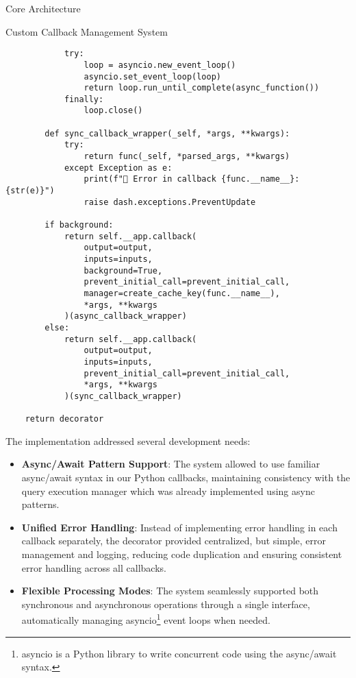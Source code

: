 \begin{section}{Core Architecture}
\begin{subsection}{Custom Callback Management System}
\begin{listing}[H]
\begin{verbatim}
            try:
                loop = asyncio.new_event_loop()
                asyncio.set_event_loop(loop)
                return loop.run_until_complete(async_function())
            finally:
                loop.close()

        def sync_callback_wrapper(_self, *args, **kwargs):
            try:
                return func(_self, *parsed_args, **kwargs)
            except Exception as e:
                print(f"🚨 Error in callback {func.__name__}: {str(e)}")
                raise dash.exceptions.PreventUpdate

        if background:
            return self.__app.callback(
                output=output,
                inputs=inputs,
                background=True,
                prevent_initial_call=prevent_initial_call,
                manager=create_cache_key(func.__name__),
                *args, **kwargs
            )(async_callback_wrapper)
        else:
            return self.__app.callback(
                output=output,
                inputs=inputs,
                prevent_initial_call=prevent_initial_call,
                *args, **kwargs
            )(sync_callback_wrapper)

    return decorator
			\end{verbatim}
			\label{lst:dashboard-implementation-callback-decorator}
		\end{listing}

		The implementation addressed several development needs:
		\begin{itemize}
			\item \textbf{Async/Await Pattern Support}: The system allowed to use familiar async/await syntax in our Python callbacks, maintaining consistency with the query execution manager which was already implemented using async
			patterns.
			\item \textbf{Unified Error Handling}: Instead of implementing error handling in each callback separately, the decorator provided centralized, but simple, error management and logging, reducing code duplication and ensuring
			consistent error handling across all callbacks.
			\item \textbf{Flexible Processing Modes}: The system seamlessly supported both synchronous and asynchronous operations through a single interface, automatically managing asyncio\footnote{
				asyncio is a Python library to write concurrent code using the async/await syntax\cite{psf_library_asyncio}.
			} event loops when needed.
		\end{itemize}


\end{subsection}
\end{section}
